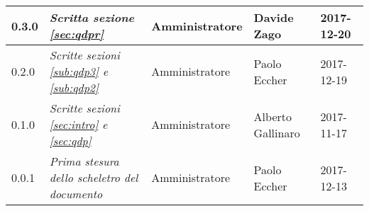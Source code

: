 \begin{table}[H]
\begin{tabular}{C{2cm}|C{4cm}|C{3cm}|C{3cm}|R{2cm}}
		0.3.0 & \emph{Scritta sezione \ref{sec:qdpr}} & Amministratore & Davide Zago & 2017-12-20 \\
		\hline
		
		0.2.0 & \emph{Scritte sezioni \ref{sub:qdp3} e \ref{sub:qdp2}} &  Amministratore & Paolo Eccher & 2017-12-19 \\
		\hline
		
		0.1.0 & \emph{Scritte sezioni \ref{sec:intro} e \ref{sec:qdp}} & Amministratore & Alberto Gallinaro & 2017-11-17 \\
		\hline
		
		0.0.1 & \emph{Prima stesura dello scheletro del documento} & Amministratore & Paolo Eccher &  2017-12-13 \\
		
	\end{tabular}
	
\end{table}


\clearpage
